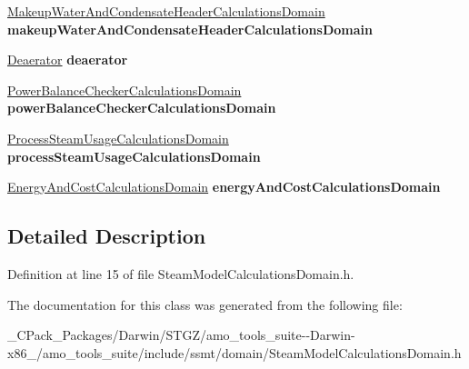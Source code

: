 \begin{DoxyCompactItemize}
\hyperlink{class_makeup_water_and_condensate_header_calculations_domain}{Makeup\+Water\+And\+Condensate\+Header\+Calculations\+Domain} {\bfseries makeup\+Water\+And\+Condensate\+Header\+Calculations\+Domain}
\item 
\mbox{\label{class_steam_model_calculations_domain_abdc6332dc9edb3f0cfcb70f1b665991e}} 
\hyperlink{class_deaerator}{Deaerator} {\bfseries deaerator}
\item 
\mbox{\label{class_steam_model_calculations_domain_aadeeca39e7326fdcff6e9b908f6a1fa5}} 
\hyperlink{class_power_balance_checker_calculations_domain}{Power\+Balance\+Checker\+Calculations\+Domain} {\bfseries power\+Balance\+Checker\+Calculations\+Domain}
\item 
\mbox{\label{class_steam_model_calculations_domain_a49ea9aeb766570329dde4ae4f384cd34}} 
\hyperlink{class_process_steam_usage_calculations_domain}{Process\+Steam\+Usage\+Calculations\+Domain} {\bfseries process\+Steam\+Usage\+Calculations\+Domain}
\item 
\mbox{\label{class_steam_model_calculations_domain_aa7acb86032dcd0d1d857d0d3c77c6b00}} 
\hyperlink{class_energy_and_cost_calculations_domain}{Energy\+And\+Cost\+Calculations\+Domain} {\bfseries energy\+And\+Cost\+Calculations\+Domain}
\end{DoxyCompactItemize}


\subsection{Detailed Description}


Definition at line 15 of file Steam\+Model\+Calculations\+Domain.\+h.



The documentation for this class was generated from the following file\+:\begin{DoxyCompactItemize}
\item 
\+\_\+\+C\+Pack\+\_\+\+Packages/\+Darwin/\+S\+T\+G\+Z/amo\+\_\+tools\+\_\+suite-\/-\/\+Darwin-\/x86\+\_/amo\+\_\+tools\+\_\+suite/include/ssmt/domain/Steam\+Model\+Calculations\+Domain.\+h\end{DoxyCompactItemize}
